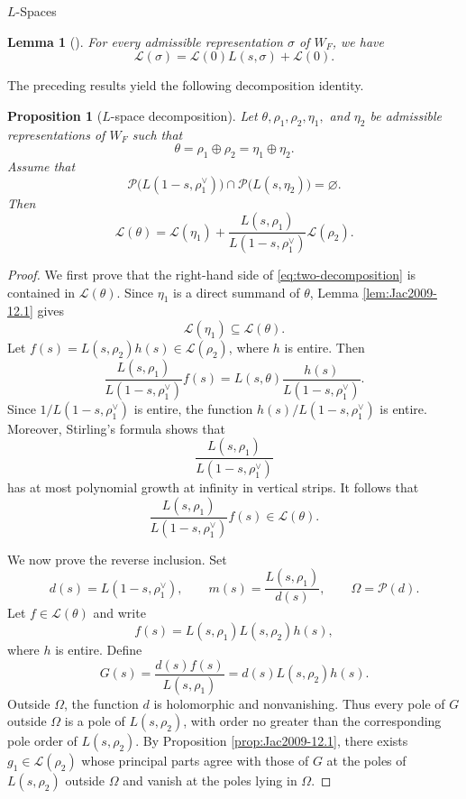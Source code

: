 \documentclass[12pt,reqno]{amsart}
\numberwithin{equation}{section}%
\numberwithin{equation}{subsection}
\newtheorem{prop}[equation]{Proposition}
\newtheorem{lemma}[equation]{Lemma}
\theoremstyle{definition}
\theoremstyle{remark}
\begin{document}
\begin{section}{\texorpdfstring{$L$}{L}-Spaces}
\begin{lemma}[{\cite[Lemma~12.2]{Jac2009}}]
\label{lem:Jac2009-12.2}
For every admissible representation $\sigma$ of $W_F$, we have
\[
\mathcal{L}(\sigma)
=
\mathcal{L}(0)L(s,\sigma)+\mathcal{L}(0).
\]
\end{lemma}

The preceding results yield the following decomposition identity.

\begin{prop}[\(L\)-space decomposition] \label{prop:two-decomposition} Let $\theta,\rho_1,\rho_2,\eta_1,$ and $\eta_2$ be admissible representations of $W_F$ such that \[ \theta = \rho_1\oplus\rho_2 = \eta_1\oplus\eta_2. \] Assume that \begin{equation} \label{eq:pole-separation} \mathcal{P}\bigl(L(1-s,\rho_1^\vee)\bigr) \cap \mathcal{P}\bigl(L(s,\eta_2)\bigr) = \varnothing. \end{equation} Then \begin{equation} \label{eq:two-decomposition} \mathcal{L}(\theta) = \mathcal{L}(\eta_1) + \frac{L(s,\rho_1)}{L(1-s,\rho_1^\vee)} \mathcal{L}(\rho_2). \end{equation} \end{prop}

\begin{proof}
We first prove that the right-hand side of
\eqref{eq:two-decomposition} is contained in $\mathcal{L}(\theta)$.
Since $\eta_1$ is a direct summand of $\theta$, Lemma
\ref{lem:Jac2009-12.1} gives
\[
\mathcal{L}(\eta_1)\subseteq\mathcal{L}(\theta).
\]
Let $f(s)=L(s,\rho_2)h(s)\in\mathcal{L}(\rho_2)$, where $h$ is entire. Then
\[
\frac{L(s,\rho_1)}{L(1-s,\rho_1^\vee)}f(s)
=
L(s,\theta)\frac{h(s)}{L(1-s,\rho_1^\vee)}.
\]
Since \(1/L(1-s,\rho_1^\vee)\) is entire, the function
$h(s)/L(1-s,\rho_1^\vee)$ is entire. Moreover, Stirling's formula
shows that
\[
\frac{L(s,\rho_1)}{L(1-s,\rho_1^\vee)}
\]
has at most polynomial growth at infinity in vertical strips. It
follows that
\[
\frac{L(s,\rho_1)}{L(1-s,\rho_1^\vee)}f(s)
\in\mathcal{L}(\theta).
\]

We now prove the reverse inclusion. Set
\[
d(s)=L(1-s,\rho_1^\vee),
\qquad
m(s)=\frac{L(s,\rho_1)}{d(s)},
\qquad
\Omega=\mathcal{P}(d).
\]
Let $f\in\mathcal{L}(\theta)$ and write
\[
f(s)=L(s,\rho_1)L(s,\rho_2)h(s),
\]
where $h$ is entire. Define
\[
G(s)=\frac{d(s)f(s)}{L(s,\rho_1)}
=
d(s)L(s,\rho_2)h(s).
\]
Outside $\Omega$, the function $d$ is holomorphic and nonvanishing.
Thus every pole of $G$ outside $\Omega$ is a pole of
$L(s,\rho_2)$, with order no greater than the corresponding pole
order of $L(s,\rho_2)$. By Proposition
\ref{prop:Jac2009-12.1}, there exists
$g_1\in\mathcal{L}(\rho_2)$ whose principal parts agree with those of
$G$ at the poles of $L(s,\rho_2)$ outside $\Omega$ and vanish at the
poles lying in $\Omega$.


\end{proof}
\end{section}
\end{document}

